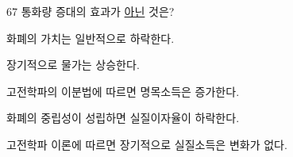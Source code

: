 \begin{question}{67}
통화량 증대의 효과가 \uline{아닌} 것은?
\begin{choices}
  \item 화폐의 가치는 일반적으로 하락한다.
  \item 장기적으로 물가는 상승한다.
  \item 고전학파의 이분법에 따르면 명목소득은 증가한다.
  \item 화폐의 중립성이 성립하면 실질이자율이 하락한다.
  \item 고전학파 이론에 따르면 장기적으로 실질소득은 변화가 없다.
\end{choices}
\end{question}
